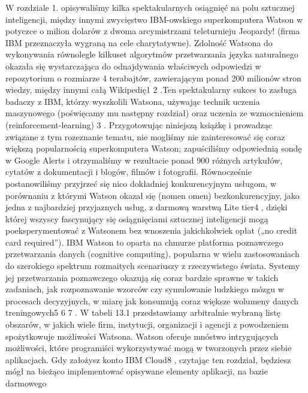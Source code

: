 \documentclass[11pt,a4paper,fleqn,leqno,titlepage]{article}
\begin{document}
W rozdziale 1. opisywaliśmy kilka spektakularnych osiągnięć na polu sztucznej inteligencji,
między innymi zwycięstwo IBM-owskiego superkomputera Watson w potyczce o milion dolarów
z dwoma arcymistrzami teleturnieju Jeopardy! (firma IBM przeznaczyła wygraną na cele charytatywne). Zdolność Watsona do wykonywania równolegle kilkuset algorytmów przetwarzania języka naturalnego okazała się wystarczająca do odnajdywania właściwych odpowiedzi w repozytorium o rozmiarze 4 terabajtów, zawierającym ponad 200 milionów stron wiedzy, między innymi
całą Wikipedię1 2
.Ten spektakularny sukces to zasługa badaczy z IBM, którzy wyszkolili Watsona, używając technik uczenia maszynowego (poświęcamy mu następny rozdział) oraz uczenia ze wzmocnieniem (reinforcement-learning)
3
.
Przygotowując niniejszą książkę i prowadząc związane z tym rozeznanie tematu, nie mogliśmy
nie zainteresować się coraz większą popularnością superkomputera Watson; zapuściliśmy odpowiednią sondę w Google Alerts i otrzymaliśmy w rezultacie ponad 900 różnych artykułów,
cytatów z dokumentacji i blogów, filmów i fotografii. Równocześnie postanowiliśmy przyjrzeć
się nico dokładniej konkurencyjnym usługom, w porównaniu z którymi Watson okazał się (nomen
omen) bezkonkurencyjny, jako jedna z najbardziej przyjaznych usług, z darmową warstwą Lite
tier4
, dzięki której wszyscy fascynujący się osiągnięciami sztucznej inteligencji mogą poeksperymentować z Watsonem bez wnoszenia jakichkolwiek opłat („no credit card required”).
IBM Watson to oparta na chmurze platforma poznawczego przetwarzania danych (cognitive computing), popularna w wielu zastosowaniach do szerokiego spektrum rozmaitych scenariuszy z rzeczywistego świata. Systemy jej przetwarzania poznawczego okazują się coraz bardzie
sprawne w takich zadaniach, jak rozpoznawanie wzorców czy symulowanie ludzkiego mózgu
w procesach decyzyjnych, w miarę jak konsumują coraz większe wolumeny danych treningowych5 6 7
. W tabeli 13.1 przedstawiamy arbitralnie wybraną listę obszarów, w jakich wiele firm,
instytucji, organizacji i agencji z powodzeniem spożytkowuje możliwości Watsona.
Watson oferuje mnóstwo intrygujących możliwości, które programiści wykorzystywać mogą
w tworzonych przez siebie aplikacjach. Gdy założysz konto IBM Cloud8
, czytając ten rozdział,
będziesz mógł na bieżąco implementować opisywane elementy aplikacji, na bazie darmowego
\end{document}
